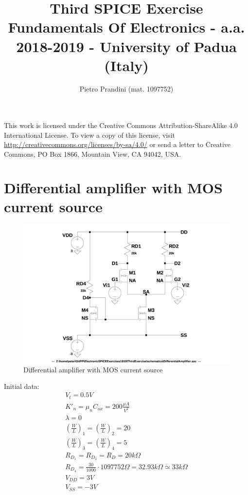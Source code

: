 \documentclass[10pt,a4paper]{book}
\title{Third SPICE Exercise\\{\small{Fundamentals Of Electronics - a.a. 2018-2019 -
University of Padua (Italy)}}}
\author{Pietro Prandini (mat. 1097752)}
\begin{document}
\maketitle

\vspace*{\fill}
\begin{center}
\tiny{This work is licensed under the Creative Commons Attribution-ShareAlike 4.0 International License. To view a copy of this license, visit \href{http://creativecommons.org/licenses/by-sa/4.0/}{http://creativecommons.org/licenses/by-sa/4.0/} or send a letter to Creative Commons, PO Box 1866, Mountain View, CA 94042, USA.}
\end{center}

\tableofcontents

\chapter{Differential amplifier with MOS current source}\label{diffampchapter}

\begin{figure}[h]
  \centering
  \includegraphics[width=12cm]{schematics/DifferentialAmplifier.jpg}
  \caption{Differential amplifier with MOS current source}
  \label{DifferentialAmplifier}
\end{figure}

Initial data:\\
\begin{align}
V_t = 0.5V\\
{K'}_n = {\mu}_n C_{ox} = 200 \frac{\mu A}{V^2}\\
\lambda = 0\\
\left(\frac{W}{L}\right)_1 = \left(\frac{W}{L}\right)_2 = 20\\
\left(\frac{W}{L}\right)_3 = \left(\frac{W}{L}\right)_4 = 5\\
R_{D_1} = R_{D_2} = R_D = 20k\Omega \label{RD}\\
R_{D_4} = \frac{30}{1000}\cdot 1097752 \Omega = 32.93k\Omega \simeq 33k\Omega\\
V_{DD} = 3V\\
V_{SS} = -3V
\end{align}
\end{document}
